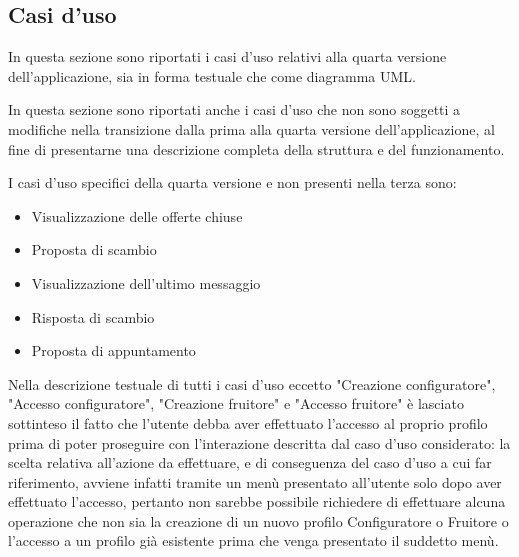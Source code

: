 \subsection{Casi d'uso}
In questa sezione sono riportati i casi d'uso relativi alla quarta versione dell'applicazione, sia in forma testuale che come diagramma UML.\bigskip 

In questa sezione sono riportati anche i casi d'uso che non sono soggetti a modifiche nella transizione dalla prima alla quarta versione dell'applicazione, al fine di presentarne una descrizione completa della struttura e del funzionamento.\bigskip

I casi d'uso specifici della quarta versione e non presenti nella terza sono:
\begin{itemize}
    \item Visualizzazione delle offerte chiuse
    \item Proposta di scambio
    \item Visualizzazione dell'ultimo messaggio
    \item Risposta di scambio
    \item Proposta di appuntamento
\end{itemize} \bigskip

Nella descrizione testuale di tutti i casi d'uso eccetto "Creazione configuratore", "Accesso configuratore", "Creazione fruitore" e "Accesso fruitore" è lasciato sottinteso il fatto che l'utente debba aver effettuato l'accesso al proprio profilo prima di poter proseguire con l'interazione descritta dal caso d'uso considerato: la scelta relativa all'azione da effettuare, e di conseguenza del caso d'uso a cui far riferimento, avviene infatti tramite un menù presentato all'utente solo dopo aver effettuato l'accesso, pertanto non sarebbe possibile richiedere di effettuare alcuna operazione che non sia la creazione di un nuovo profilo Configuratore o Fruitore o l'accesso a un profilo già esistente prima che venga presentato il suddetto menù.\bigskip



